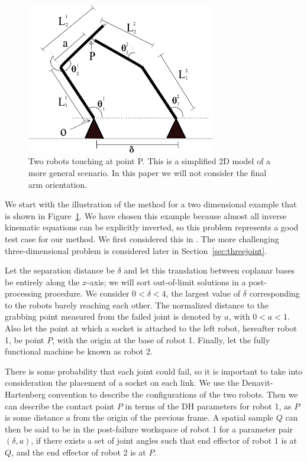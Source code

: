 \documentclass[12pt]{report}
\begin{document}
\begin{figure}
\begin{center}
	\includegraphics[width=3.25in]{../diagrams/RRtimestwo.pdf}
	\caption{\small{Two robots touching at point P. This is a simplified 2D model of a more general scenario. In this paper we will not consider the final arm orientation.}}
	\label{fig:TwoRobotsTouchingAtPointP2}
	\end{center}
\end{figure}

We start with the illustration of the method for 
a two dimensional example that is  shown in Figure~\ref{fig:TwoRobotsTouchingAtPointP2}. We have chosen this example because almost all inverse kinematic equations can be explicitly inverted, so this problem represents a good test case for our method.  We first considered this in \cite{BBPM10}.  The more challenging three-dimensional problem is considered later in Section~\ref{sec:threejoint}. 

Let the separation distance be $\delta$ and let this translation between  coplanar bases be entirely along the $x$-axis; we will sort out-of-limit solutions in a post-processing procedure.  We consider $0<\delta<4$, the largest value of $\delta$ corresponding to the robots barely reaching each other.  The normalized distance to the  grabbing point measured from the failed joint is denoted by $a$, with $0<a<1$.  Also let the point at which a socket is attached to the left robot, hereafter robot 1, be point $P$, with the origin at the base of robot 1.  Finally, let the fully functional machine be known as robot 2.

There is some probability that each joint could fail, so it is important to take into consideration the placement of a socket on each link.  We use the Denavit-Hartenberg convention to describe the configurations of the two robots.  Then we can describe the contact point $P$ in terms of the DH parameters for robot 1, as  $P$ is some distance $a$ from the origin of the previous frame.   A spatial sample $Q$ can then be said to be in the post-failure workspace of robot 1 for a parameter pair $(\delta,a)$, if there exists a set of joint angles such that end effector of robot 1 is at $Q$, and the end effector of robot 2 is at $P$.
\end{document}
